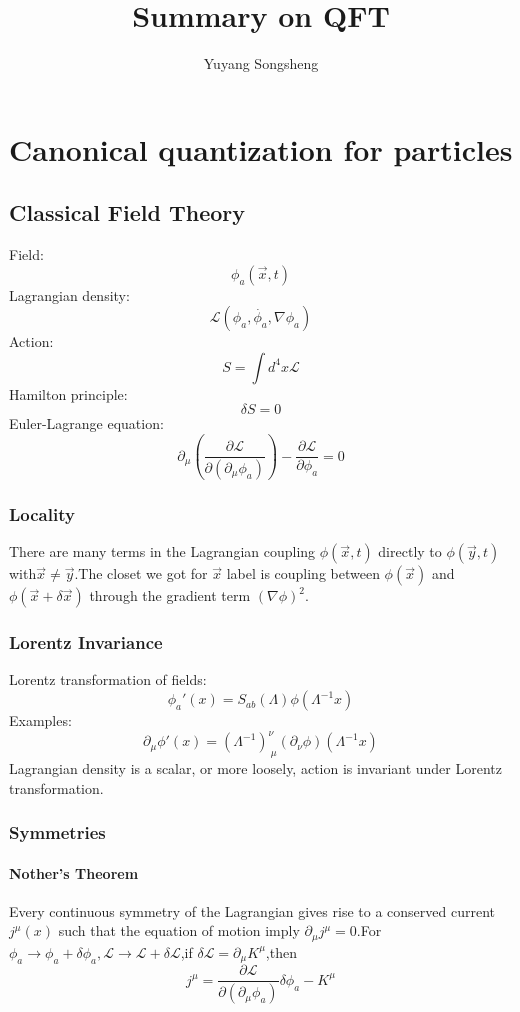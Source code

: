 \documentclass{article}
\author{Yuyang Songsheng}
\title{Summary on QFT}
\begin{document}
\maketitle
\section{Canonical quantization for particles}
\subsection{Classical Field Theory}
Field:
\[\phi_{a}(\vec{x},t)\]
Lagrangian density:
\[\mathcal{L}(\phi_a,\dot{\phi_a},\nabla\phi_a)\]
Action:
\[ S=\int d^4x\mathcal{L} \]
Hamilton principle:
\begin{equation}
\delta S=0
\end{equation}
Euler-Lagrange equation:
\begin{equation}
\partial_{\mu}( \frac{\partial \mathcal{L}}{\partial(\partial_{\mu}\phi_{a})})-\frac{\partial \mathcal{L}}{\partial \phi_a}=0
\end{equation}

\subsubsection{Locality}
There are many terms in the Lagrangian coupling $\phi(\vec{x},t)$ directly to $\phi(\vec{y},t)$ with$\vec{x} \neq \vec{y}$.The closet we got for $\vec{x}$ label is coupling between $\phi(\vec{x})$ and $\phi(\vec{x}+\delta \vec{x})$ through the gradient term $(\nabla \phi)^2$.

\subsubsection{Lorentz Invariance}
Lorentz transformation of fields:
\begin{equation}
\phi_{a} '(x)=S_{ab}(\Lambda)\phi(\Lambda^{-1}x)
\end{equation}
Examples:
\begin{equation}
\partial_{\mu}\phi'(x)=(\Lambda^{-1})^{\nu}_{\ \mu}(\partial_{\nu}\phi)(\Lambda^{-1}x)
\end{equation}
Lagrangian density is a scalar, or more loosely, action is invariant under Lorentz transformation.

\subsubsection{Symmetries}
\paragraph{Nother's Theorem} Every continuous symmetry of the Lagrangian gives rise to a conserved current $j^{\mu}(x)$ such that the equation of motion imply $\partial_{\mu}j^{\mu}=0$.For $\phi_{a} \to \phi_{a}+\delta \phi_{a},\mathcal{L} \to \mathcal{L}+\delta \mathcal{L}$,if $\delta \mathcal{L}=\partial_{\mu}K^{\mu}$,then
\begin{equation}
j^{\mu}=\frac{\partial\mathcal{L}}{\partial(\partial_{\mu}\phi_{a})}\delta\phi_{a}-K^{\mu}
\end{equation}
\end{document}
